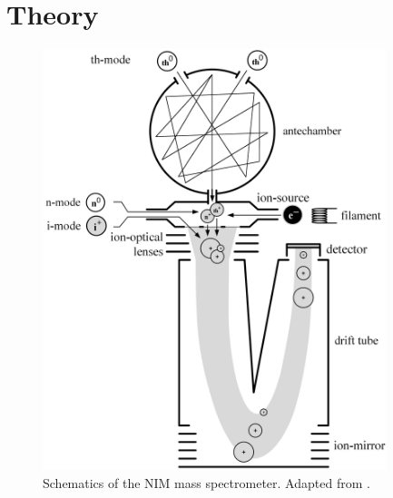 \section{Theory} \label{sec:theory}

	\begin{figure}[h]
		\centering
		\includegraphics[width= 10cm]{Bilder/NIM_Sketch.png}
		\caption{Schematics of the NIM mass spectrometer. Adapted from \cite{Diss_Meyer}.}
		\label{fig:NIMSketch}
	\end{figure}
	

